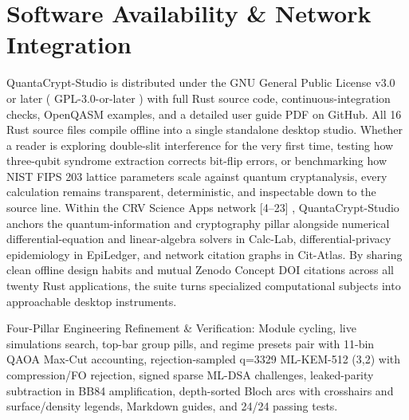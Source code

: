 \documentclass[10pt,letterpaper]{article}
\begin{document}
\section{Software Availability \& Network Integration}
QuantaCrypt-Studio is distributed under the GNU General Public License v3.0 or later ( GPL-3.0-or-later ) with full Rust source code, continuous-integration checks, OpenQASM examples, and a detailed user guide PDF on GitHub. All 16 Rust source files compile offline into a single standalone desktop studio. Whether a reader is exploring double-slit interference for the very first time, testing how three-qubit syndrome extraction corrects bit-flip errors, or benchmarking how NIST FIPS 203 lattice parameters scale against quantum cryptanalysis, every calculation remains transparent, deterministic, and inspectable down to the source line. Within the CRV Science Apps network [4--23] , QuantaCrypt-Studio anchors the quantum-information and cryptography pillar alongside numerical differential-equation and linear-algebra solvers in Calc-Lab, differential-privacy epidemiology in EpiLedger, and network citation graphs in Cit-Atlas. By sharing clean offline design habits and mutual Zenodo Concept DOI citations across all twenty Rust applications, the suite turns specialized computational subjects into approachable desktop instruments.

Four-Pillar Engineering Refinement \& Verification: Module cycling, live simulations search, top-bar group pills, and regime presets pair with 11-bin QAOA Max-Cut accounting, rejection-sampled q=3329 ML-KEM-512 (3,2) with compression/FO rejection, signed sparse ML-DSA challenges, leaked-parity subtraction in BB84 amplification, depth-sorted Bloch arcs with crosshairs and surface/density legends, Markdown guides, and 24/24 passing tests.
\end{document}
